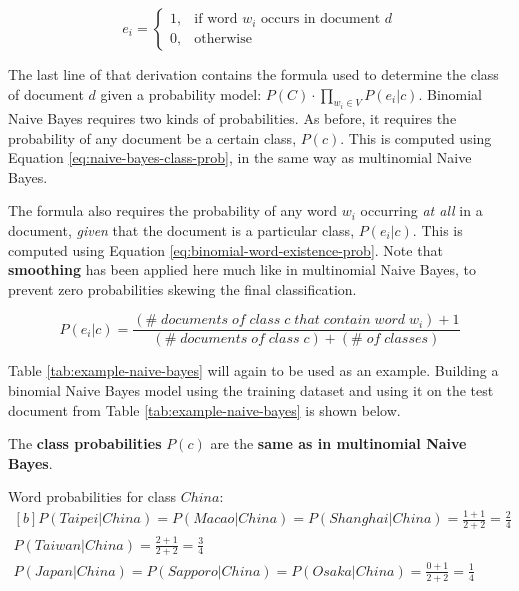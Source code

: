 \documentclass{article}
\begin{document}
\begin{equation}
	e_i = \begin{cases}
		1,& \text{if word }w_i\text{ occurs in document }d \\
		0,& \text{otherwise}
	\end{cases}
	\label{eq:binomial-e-i}
\end{equation}

The last line of that derivation contains the formula used to determine the class of document $d$ given a probability model:  $P(C) \cdot \prod_{w_i \in V} {P(e_i|c)}$. Binomial Naive Bayes requires two kinds of probabilities. As before, it requires the probability of any document be a certain class, $P(c)$. This is computed using Equation \ref{eq:naive-bayes-class-prob}, in the same way as multinomial Naive Bayes.

The formula also requires the probability of any word $w_i$ occurring \textit{at all} in a document, \textit{given} that the document is a particular class, $P(e_i|c)$. This is computed using Equation \ref{eq:binomial-word-existence-prob}. Note that \textbf{smoothing} has been applied here much like in multinomial Naive Bayes, to prevent zero probabilities skewing the final classification.

\begin{equation}
	P(e_i|c) = \frac{(\#\;documents\;of\;class\;c\;that\;contain\;word\;w_i) + 1}{(\#\;documents\;of\;class\;c) + (\#\;of\;classes)}	
	\label{eq:binomial-word-existence-prob}
\end{equation}

Table \ref{tab:example-naive-bayes} will again to be used as an example. Building a binomial Naive Bayes model using the training dataset and using it on the test document from Table \ref{tab:example-naive-bayes} is shown below.

The \textbf{class probabilities} $P(c)$ are the \textbf{same as in multinomial Naive Bayes}.

Word probabilities for class $China$:
\begin{equation}
\begin{aligned}[b]
P(Taipei|China) = P(Macao|China) = P(Shanghai|China) = \frac{1 + 1}{2 + 2} = \frac{2}{4} \\
P(Taiwan|China) = \frac{2 + 1}{2 + 2} = \frac{3}{4} \\
P(Japan|China) = P(Sapporo|China) = P(Osaka|China) = \frac{0 + 1}{2 + 2} = \frac{1}{4}
\end{aligned}
\end{equation}
\end{document}
